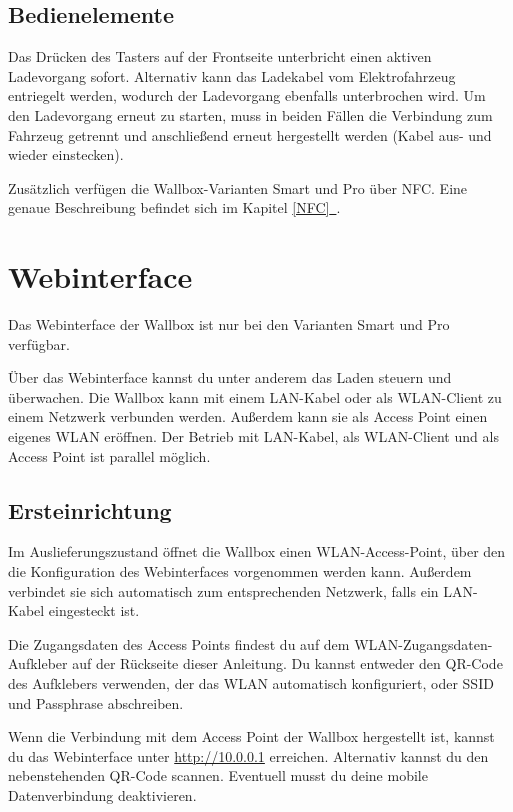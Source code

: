 \documentclass[a4paper,10pt]{article}
\newcommand*{\fullref}[1]{\hyperref[{#1}]{\ref*{#1}~\nameref*{#1}}}
\begin{document}
\begin{multicols*}{2}
	\subsection{Bedienelemente}\label{lockswitch}
	Das Drücken des Tasters auf der Frontseite unterbricht einen aktiven Ladevorgang
	sofort. Alternativ kann das Ladekabel vom Elektrofahrzeug entriegelt werden,
	wodurch der Ladevorgang ebenfalls unterbrochen wird. Um den Ladevorgang erneut
	zu starten, muss in beiden Fällen die Verbindung zum Fahrzeug getrennt und
	anschließend erneut hergestellt werden (Kabel aus- und wieder einstecken).

	Zusätzlich verfügen die Wallbox-Varianten Smart und Pro über NFC. Eine
	genaue Beschreibung befindet sich im Kapitel \fullref{NFC}.

	\newpage
	\section{Webinterface}
	Das Webinterface der Wallbox ist nur bei den Varianten Smart und Pro verfügbar.

	Über das Webinterface kannst du unter anderem das Laden steuern und überwachen.
	Die Wallbox kann mit einem LAN-Kabel oder als WLAN-Client zu einem Netzwerk verbunden werden.
	Außerdem kann sie als Access Point einen eigenes WLAN eröffnen.
	Der Betrieb mit LAN-Kabel, als WLAN-Client und als Access Point ist parallel möglich.

	\subsection{Ersteinrichtung}
	Im Auslieferungszustand öffnet die Wallbox einen WLAN-Access-Point, über den
	die Konfiguration des Webinterfaces vorgenommen werden kann. Außerdem verbindet sie sich automatisch
	zum entsprechenden Netzwerk, falls ein LAN-Kabel eingesteckt ist.

	Die Zugangsdaten des Access Points findest du auf dem WLAN-Zugangsdaten-Aufkleber
	auf der Rückseite dieser Anleitung. Du kannst entweder den QR-Code des Aufklebers verwenden,
	der das WLAN automatisch konfiguriert, oder SSID und Passphrase abschreiben.

	\begin{minipage}{0.35\textwidth}
		Wenn die Verbindung mit dem Access Point der Wallbox hergestellt ist, kannst du das Webinterface
		unter \url{http://10.0.0.1} erreichen. Alternativ kannst du den nebenstehenden QR-Code scannen.
		Eventuell musst du deine mobile Datenverbindung deaktivieren.
	\end{minipage}\hfill
	\begin{minipage}{0.12\textwidth}
		\begin{flushright}
		\end{flushright}
	\end{minipage}


\end{multicols*}
\end{document}
